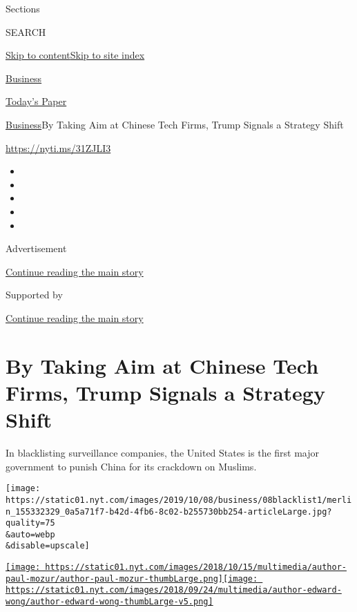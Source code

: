 Sections

SEARCH

\protect\hyperlink{site-content}{Skip to
content}\protect\hyperlink{site-index}{Skip to site index}

\href{https://www.nytimes.com/section/business}{Business}

\href{https://myaccount.nytimes.com/auth/login?response_type=cookie\&client_id=vi}{}

\href{https://www.nytimes.com/section/todayspaper}{Today's Paper}

\href{/section/business}{Business}\textbar{}By Taking Aim at Chinese
Tech Firms, Trump Signals a Strategy Shift

\url{https://nyti.ms/31ZJLI3}

\begin{itemize}
\item
\item
\item
\item
\item
\end{itemize}

Advertisement

\protect\hyperlink{after-top}{Continue reading the main story}

Supported by

\protect\hyperlink{after-sponsor}{Continue reading the main story}

\hypertarget{by-taking-aim-at-chinese-tech-firms-trump-signals-a-strategy-shift}{%
\section{By Taking Aim at Chinese Tech Firms, Trump Signals a Strategy
Shift}\label{by-taking-aim-at-chinese-tech-firms-trump-signals-a-strategy-shift}}

In blacklisting surveillance companies, the United States is the first
major government to punish China for its crackdown on Muslims.

\texttt{[image: https://static01.nyt.com/images/2019/10/08/business/08blacklist1/merlin\_155332329\_0a5a71f7-b42d-4fb6-8c02-b255730bb254-articleLarge.jpg?quality=75\\\&auto=webp\\\&disable=upscale]}

\href{https://www.nytimes.com/by/paul-mozur}{\texttt{[image: https://static01.nyt.com/images/2018/10/15/multimedia/author-paul-mozur/author-paul-mozur-thumbLarge.png]}}\href{https://www.nytimes.com/by/edward-wong}{\texttt{[image: https://static01.nyt.com/images/2018/09/24/multimedia/author-edward-wong/author-edward-wong-thumbLarge-v5.png]}}

